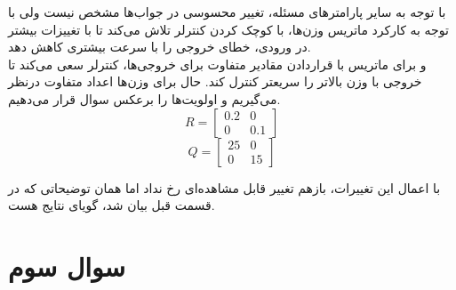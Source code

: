 \documentclass[14pt, a4paper]{extarticle}
\begin{document}
با توجه به سایر پارامترهای مسئله، تغییر محسوسی در جواب‌ها مشخص نیست ولی با توجه به کارکرد ماتریس وزن‌ها، با کوچک کردن
کنترلر تلاش می‌کند تا با تغییزات بیشتر در ورودی، خطای خروجی را با سرعت بیشتری کاهش دهد.\\
و برای ماتریس 
با قراردادن مقادیر متفاوت برای خروجی‌ها، کنترلر سعی می‌کند تا خروجی با وزن بالاتر را سریعتر کنترل کند.
\newpage
حال برای وزن‌ها اعداد متفاوت درنظر می‌گیریم و اولویت‌ها را برعکس سوال قرار می‌دهیم.\\
\[
R = \begin{bmatrix}
	0.2 & 0 \\
	0 & 0.1
\end{bmatrix}
\]
\[
Q = \begin{bmatrix}
	25 & 0 \\
	0 & 15
\end{bmatrix}
\]

با اعمال این تغییرات، بازهم تغییر قابل مشاهده‌ای رخ نداد اما همان توضیحاتی که در قسمت قبل بیان شد، گویای نتایج هست.
\newpage
\section{سوال سوم}
\end{document}
